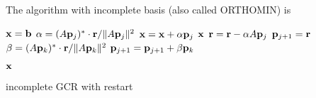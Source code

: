 The algorithm with incomplete basis (also called ORTHOMIN) is
\begin{algorithm}[H]
\begin{algorithmic}
\State ${\bf x}={\bf b}$
        \State $\alpha = (A{\bf p}_j)^*\cdot {\bf r} / \|A{\bf p}_j\|^2$
        \State ${\bf x}={\bf x}+\alpha {\bf p}_j$
            \Return $\bf x$
        \EndIf
        \State ${\bf r}={\bf r}-\alpha A{\bf p}_j$
        \State ${\bf p}_{j+1}={\bf r}$
            \State $\beta = (A{\bf p}_k)^*\cdot {\bf r} / \|A{\bf p}_k\|^2$
            \State ${\bf p}_{j+1}={\bf p}_{j+1}+\beta {\bf p}_k$
        \EndFor
    \EndFor
\EndFor

\Return $\bf x$
\end{algorithmic}
\caption{incomplete GCR with restart}
\end{algorithm}
